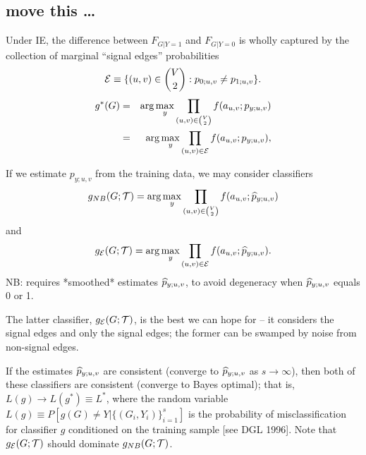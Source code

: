 
\subsection{move this \dots}

Under IE,
the difference between
$F_{G|Y=1}$ and $F_{G|Y=0}$
is wholly captured by the collection of marginal ``signal edges'' probabilities
$$\mathcal{E} \equiv \{(u,v) \in {V \choose 2}: p_{0;u,v} \neq p_{1;u,v}\}.$$
\begin{eqnarray}
g^*(G) &=& \arg\max_y \prod_{(u,v) \in {V \choose 2}} f(a_{u,v};p_{y;u,v}) \\
       &=& \arg\max_y \prod_{(u,v) \in \mathcal{E}} f(a_{u,v};p_{y;u,v}),
\end{eqnarray}

If we estimate $p_{y;u,v}$ from the training data,
we may consider classifiers
\begin{eqnarray}
g_{NB}(G;\mathcal{T}) = \arg\max_y \prod_{(u,v) \in {V \choose 2}} f(a_{u,v};\widehat{p}_{y;u,v})
\end{eqnarray}
and
\begin{eqnarray}
g_{\mathcal{E}}(G;\mathcal{T}) = \arg\max_y \prod_{(u,v) \in \mathcal{E}} f(a_{u,v};\widehat{p}_{y;u,v}).
\end{eqnarray}
NB: requires *smoothed* estimates $\widehat{p}_{y;u,v}$,
to avoid degeneracy when $\widehat{p}_{y;u,v}$ equals 0 or 1.

The latter classifier, $g_{\mathcal{E}}(G;\mathcal{T})$,
is the best we can hope for -- it considers the signal edges and only the signal edges;
the former can be swamped by noise from non-signal edges.

If the estimates $\widehat{p}_{y;u,v}$ are consistent (converge to $\widehat{p}_{y;u,v}$ as $s \rightarrow \infty$),
then both of these classifiers are consistent (converge to Bayes optimal);
that is, $L(g) \rightarrow L(g^*) \equiv L^*$,
where the random variable $L(g) \equiv P[g(G) \neq Y| \{(G_i,Y_i)\}_{i=1}^s]$
is the probability of misclassification for classifier $g$
conditioned on the training sample [see DGL 1996].
Note that $g_{\mathcal{E}}(G;\mathcal{T})$ should dominate $g_{NB}(G;\mathcal{T})$.



\clearpage


%

%



